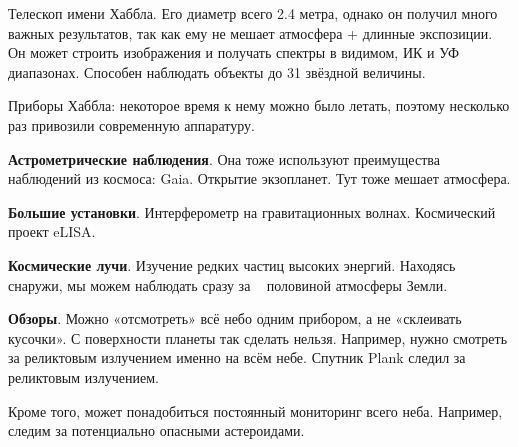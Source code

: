 Телескоп имени Хаббла. Его диаметр всего 2.4 метра, однако он получил много важных результатов, так как ему не мешает атмосфера + длинные экспозиции. Он может строить изображения и получать спектры в видимом, ИК и УФ диапазонах. Способен наблюдать объекты до 31 звёздной величины.

Приборы Хаббла: некоторое время к нему можно было летать, поэтому несколько раз привозили современную аппаратуру. 

\medspace

\textbf{Астрометрические наблюдения}. Она тоже используют преимущества наблюдений из  космоса:  Gaia. Открытие экзопланет. Тут тоже мешает атмосфера.

\textbf{Большие установки}. Интерферометр на гравитационных волнах. Космический проект eLISA. 

\textbf{Космические лучи}. Изучение редких частиц высоких энергий. Находясь снаружи, мы можем наблюдать сразу за ~ половиной атмосферы Земли.

\textbf{Обзоры}. Можно «отсмотреть» всё небо одним прибором, а не «склеивать кусочки». С поверхности планеты так сделать нельзя. Например, нужно смотреть за реликтовым излучением именно на всём небе. Спутник Plank следил за реликтовым излучением.

Кроме того, может понадобиться постоянный мониторинг всего неба. Например, следим за потенциально опасными астероидами.




